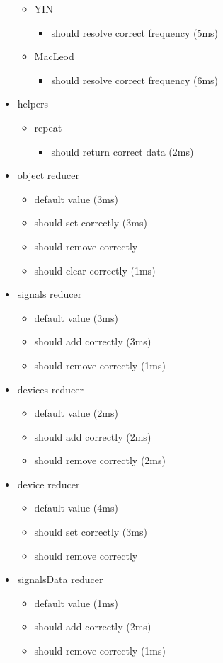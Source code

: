 \begin{annexesenv}
\begin{itemize}
\begin{itemize}
		\item YIN
		\begin{itemize}
			\item should resolve correct frequency (5ms)
		\end{itemize}
		\item MacLeod
		\begin{itemize}
    	\item should resolve correct frequency (6ms)
		\end{itemize}
	\end{itemize}
	\item helpers
	\begin{itemize}
		\item repeat
		\begin{itemize}
			\item should return correct data (2ms)
		\end{itemize}
	\end{itemize}
	\item object reducer
	\begin{itemize}
		\item	default value (3ms)
		\item should set correctly (3ms)
		\item should remove correctly
		\item should clear correctly (1ms)
	\end{itemize}
	\item signals reducer
	\begin{itemize}
		\item default value (3ms)
		\item should add correctly (3ms)
		\item should remove correctly (1ms)
	\end{itemize}
	\item devices reducer
	\begin{itemize}
		\item default value (2ms)
		\item should add correctly (2ms)
		\item should remove correctly (2ms)
	\end{itemize}
	\item device reducer
	\begin{itemize}
		\item default value (4ms)
		\item should set correctly (3ms)
		\item should remove correctly
	\end{itemize}
	\item signalsData reducer
	\begin{itemize}
		\item default value (1ms)
		\item should add correctly (2ms)
		\item should remove correctly (1ms)
	\end{itemize}
\end{itemize}

\end{annexesenv}
